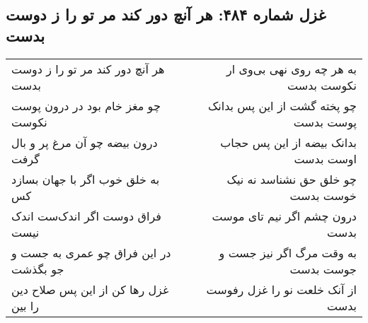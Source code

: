 \begin{center}
\section*{غزل شماره ۴۸۴: هر آنچ دور کند مر تو را ز دوست بدست}
\label{sec:0484}
\begin{longtable}{l p{0.5cm} r}
هر آنچ دور کند مر تو را ز دوست بدست
&&
به هر چه روی نهی بی‌وی ار نکوست بدست
\\
چو مغز خام بود در درون پوست نکوست
&&
چو پخته گشت از این پس بدانک پوست بدست
\\
درون بیضه چو آن مرغ پر و بال گرفت
&&
بدانک بیضه از این پس حجاب اوست بدست
\\
به خلق خوب اگر با جهان بسازد کس
&&
چو خلق حق نشناسد نه نیک خوست بدست
\\
فراق دوست اگر اندک‌ست اندک نیست
&&
درون چشم اگر نیم تای موست بدست
\\
در این فراق چو عمری به جست و جو بگذشت
&&
به وقت مرگ اگر نیز جست و جوست بدست
\\
غزل رها کن از این پس صلاح دین را بین
&&
از آنک خلعت نو را غزل رفوست بدست
\\
\end{longtable}
\end{center}

